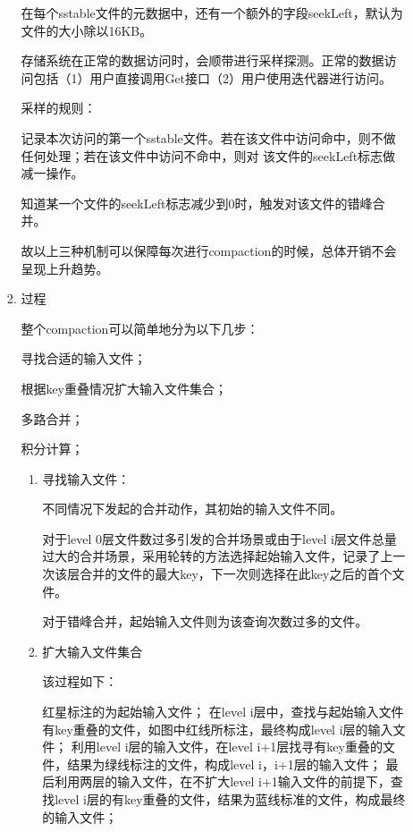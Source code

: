 \begin{enumerate}
\begin{enumerate}
\begin{enumerate}
				在每个sstable文件的元数据中，还有一个额外的字段seekLeft，默认为文件的大小除以16KB。
				
				存储系统在正常的数据访问时，会顺带进行采样探测。正常的数据访问包括（1）用户直接调用Get接口（2）用户使用迭代器进行访问。
				
				采样的规则：
				
				记录本次访问的第一个sstable文件。若在该文件中访问命中，则不做任何处理；若在该文件中访问不命中，则对 该文件的seekLeft标志做减一操作。
				
				知道某一个文件的seekLeft标志减少到0时，触发对该文件的错峰合并。
				
				故以上三种机制可以保障每次进行compaction的时候，总体开销不会呈现上升趋势。
				
				\item 过程
				
				整个compaction可以简单地分为以下几步：
				
				寻找合适的输入文件；

				根据key重叠情况扩大输入文件集合；
				
				多路合并；
				
				积分计算；
				
				\begin{enumerate}
					\item 寻找输入文件：
				
					不同情况下发起的合并动作，其初始的输入文件不同。
					
					对于level 0层文件数过多引发的合并场景或由于level i层文件总量过大的合并场景，采用轮转的方法选择起始输入文件，记录了上一次该层合并的文件的最大key，下一次则选择在此key之后的首个文件。
					
					对于错峰合并，起始输入文件则为该查询次数过多的文件。
					
					\item 扩大输入文件集合
					
					该过程如下：
					
					红星标注的为起始输入文件；
					在level i层中，查找与起始输入文件有key重叠的文件，如图中红线所标注，最终构成level i层的输入文件；
					利用level i层的输入文件，在level i+1层找寻有key重叠的文件，结果为绿线标注的文件，构成level i，i+1层的输入文件；
					最后利用两层的输入文件，在不扩大level i+1输入文件的前提下，查找level i层的有key重叠的文件，结果为蓝线标准的文件，构成最终的输入文件；
					


\end{enumerate}
\end{enumerate}
\end{enumerate}
\end{enumerate}
